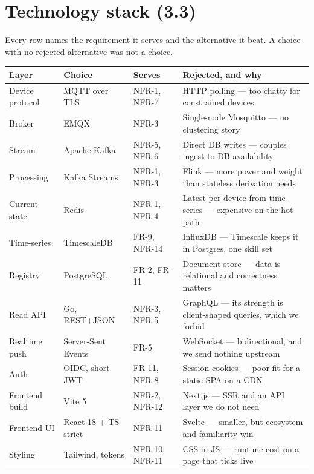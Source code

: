 \documentclass[11pt,a4paper]{article}
\begin{document}
\section{Technology stack (3.3)}

Every row names the requirement it serves and the alternative it beat. A choice with
no rejected alternative was not a choice.

\begin{center}
\small
\begin{tabularx}{\textwidth}{@{}l l l X@{}}
\toprule
\textbf{Layer} & \textbf{Choice} & \textbf{Serves} & \textbf{Rejected, and why} \\
\midrule
Device protocol & MQTT over TLS & NFR-1, NFR-7 & HTTP polling --- too chatty for constrained devices \\
Broker          & EMQX          & NFR-3        & Single-node Mosquitto --- no clustering story \\
Stream          & Apache Kafka  & NFR-5, NFR-6 & Direct DB writes --- couples ingest to DB availability \\
Processing      & Kafka Streams & NFR-1, NFR-3 & Flink --- more power and weight than stateless derivation needs \\
Current state   & Redis         & NFR-1, NFR-4 & Latest-per-device from time-series --- expensive on the hot path \\
Time-series     & TimescaleDB   & FR-9, NFR-14 & InfluxDB --- Timescale keeps it in Postgres, one skill set \\
Registry        & PostgreSQL    & FR-2, FR-11  & Document store --- data is relational and correctness matters \\
Read API        & Go, REST+JSON & NFR-3, NFR-5 & GraphQL --- its strength is client-shaped queries, which we forbid \\
Realtime push   & Server-Sent Events & FR-5   & WebSocket --- bidirectional, and we send nothing upstream \\
Auth            & OIDC, short JWT & FR-11, NFR-8 & Session cookies --- poor fit for a static SPA on a CDN \\
\midrule
Frontend build  & Vite 5        & NFR-2, NFR-12 & Next.js --- SSR and an API layer we do not need \\
Frontend UI     & React 18 + TS strict & NFR-11 & Svelte --- smaller, but ecosystem and familiarity win \\
Styling         & Tailwind, tokens & NFR-10, NFR-11 & CSS-in-JS --- runtime cost on a page that ticks live \\

\end{tabularx}
\end{center}
\end{document}
